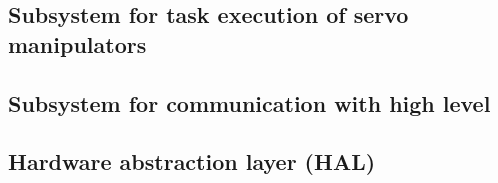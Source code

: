 \documentclass[a4paper,12pt]{article} %
\begin{document}
\subsection{Subsystem for task execution of servo manipulators}

\subsection{Subsystem for communication with high level}

\subsection{Hardware abstraction layer (HAL)}


\end{document}
